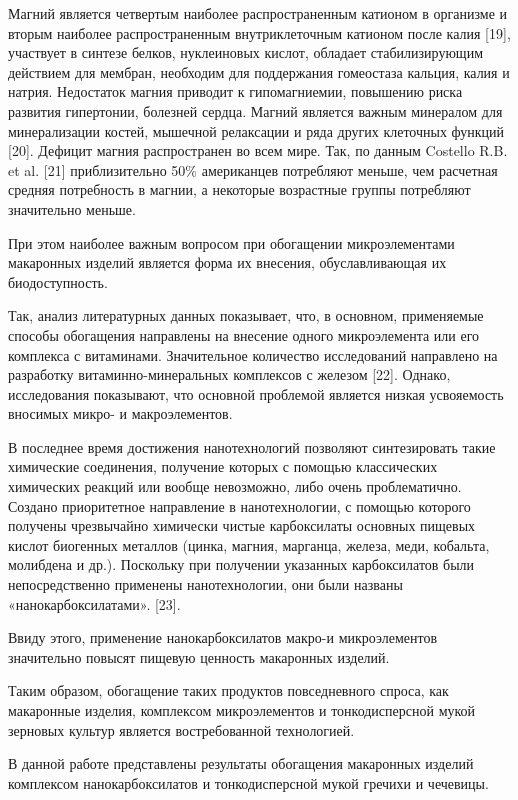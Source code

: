 Магний является четвертым наиболее распространенным катионом в организме
и вторым наиболее распространенным внутриклеточным катионом после калия
{[}19{]}, участвует в синтезе белков, нуклеиновых кислот, обладает
стабилизирующим действием для мембран, необходим для поддержания
гомеостаза кальция, калия и натрия. Недостаток магния приводит к
гипомагниемии, повышению риска развития гипертонии, болезней сердца.
Магний является важным минералом для минерализации костей, мышечной
релаксации и ряда других клеточных функций {[}20{]}. Дефицит магния
распространен во всем мире. Так, по данным Costello R.B. et al. {[}21{]}
приблизительно 50\% американцев потребляют меньше, чем расчетная средняя
потребность в магнии, а некоторые возрастные группы потребляют
значительно меньше.

При этом наиболее важным вопросом при обогащении микроэлементами
макаронных изделий является форма их внесения, обуславливающая их
биодоступность.

Так, анализ литературных данных показывает, что, в основном, применяемые
способы обогащения направлены на внесение одного микроэлемента или его
комплекса с витаминами. Значительное количество исследований направлено
на разработку витаминно-минеральных комплексов с железом {[}22{]}.
Однако, исследования показывают, что основной проблемой является низкая
усвояемость вносимых микро- и макроэлементов.

В последнее время достижения нанотехнологий позволяют синтезировать
такие химические соединения, получение которых с помощью классических
химических реакций или вообще невозможно, либо очень проблематично.
Создано приоритетное направление в нанотехнологии, с помощью которого
получены чрезвычайно химически чистые карбоксилаты основных пищевых
кислот биогенных металлов (цинка, магния, марганца, железа, меди,
кобальта, молибдена и др.). Поскольку при получении указанных
карбоксилатов были непосредственно применены нанотехнологии, они были
названы «нанокарбоксилатами». {[}23{]}.

Ввиду этого, применение нанокарбоксилатов макро-и микроэлементов
значительно повысят пищевую ценность макаронных изделий.

Таким образом, обогащение таких продуктов повседневного спроса, как
макаронные изделия, комплексом микроэлементов и тонкодисперсной мукой
зерновых культур является востребованной технологией.

В данной работе представлены результаты обогащения макаронных изделий
комплексом нанокарбоксилатов и тонкодисперсной мукой гречихи и чечевицы.

